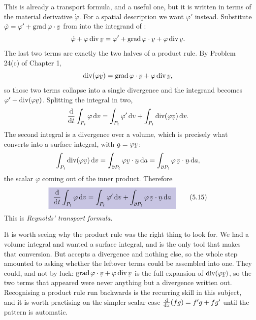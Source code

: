 This is already a transport formula, and a useful one, but it is written
in terms of the material derivative $\dot\varphi$. For a spatial
description we want $\varphi'$ instead. Substitute
$\dot\varphi=\varphi'+\ip{\grad\varphi}\bv$ from  into the
integrand of :
\[
   \dot\varphi+\varphi\dvg\bv
   =\varphi'+\ip{\grad\varphi}\bv+\varphi\dvg\bv .
\]
The last two terms are exactly the two halves of a product rule. By
Problem 24(c) of Chapter 1,
\[
   \dvg(\varphi\bv)=\ip{\grad\varphi}\bv+\varphi\dvg\bv ,
\]
so those two terms collapse into a single divergence and the integrand
becomes $\varphi'+\dvg(\varphi\bv)$. Splitting the integral in two,
\[
   \frac{\dl}{\dl t}\int_{P_{t}}\varphi\,\dl v
   =\int_{P_{t}}\varphi'\,\dl v+\int_{P_{t}}\dvg(\varphi\bv)\,\dl v .
\]
The second integral is a divergence over a volume, which is precisely what
 converts into a surface integral, with $\ba=\varphi\bv$:
\[
   \int_{P_{t}}\dvg(\varphi\bv)\,\dl v
   =\int_{\partial P_{t}}\ip{\varphi\bv}\bn\,\dl a
   =\int_{\partial P_{t}}\varphi\,\ip\bv\bn\,\dl a ,
\]
the scalar $\varphi$ coming out of the inner product. Therefore
\begin{equation}
   \boxed{\ \frac{\dl}{\dl t}\int_{P_{t}}\varphi\,\dl v
   =\int_{P_{t}}\varphi'\,\dl v
   +\int_{\partial P_{t}}\varphi\,\ip\bv\bn\,\dl a\ }
   \tag{5.15}\label{eq:5.15}
\end{equation}
This is \emph{Reynolds' transport formula}.

It is worth seeing why the product rule was the right thing to look for.
We had a volume integral and wanted a surface integral, and  is
the only tool that makes that conversion. But  accepts a
divergence and nothing else, so the whole step amounted to asking whether
the leftover terms could be assembled into one. They could, and not by
luck: $\ip{\grad\varphi}\bv+\varphi\dvg\bv$ is the full expansion of
$\dvg(\varphi\bv)$, so the two terms that appeared were never anything
but a divergence written out. Recognising a product rule run backwards is
the recurring skill in this subject, and it is worth practising on the
simpler scalar case $\frac{\mathrm{d}}{\mathrm{d} x}(fg)=f'g+fg'$ until the pattern is
automatic.

